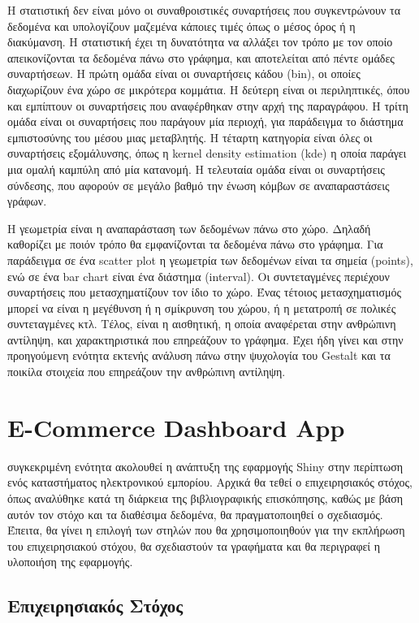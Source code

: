 \documentclass[greek, 12pt]{article}
\begin{document}
Η στατιστική δεν είναι μόνο οι συναθροιστικές συναρτήσεις που συγκεντρώνουν τα δεδομένα και υπολογίζουν μαζεμένα κάποιες τιμές όπως ο μέσος όρος ή η διακύμανση. Η στατιστική έχει τη δυνατότητα να αλλάξει τον τρόπο με τον οποίο απεικονίζονται τα δεδομένα πάνω στο γράφημα, και αποτελείται από πέντε ομάδες συναρτήσεων. Η πρώτη ομάδα είναι οι συναρτήσεις κάδου (bin), οι οποίες διαχωρίζουν ένα χώρο σε μικρότερα κομμάτια. Η δεύτερη είναι οι περιληπτικές, όπου και εμπίπτουν οι συναρτήσεις που αναφέρθηκαν στην αρχή της παραγράφου. Η τρίτη ομάδα είναι οι συναρτήσεις που παράγουν μία περιοχή, για παράδειγμα το διάστημα εμπιστοσύνης του μέσου μιας μεταβλητής. Η τέταρτη κατηγορία είναι όλες οι συναρτήσεις εξομάλυνσης, όπως η kernel density estimation (kde) η οποία παράγει μια ομαλή καμπύλη από μία κατανομή. Η τελευταία ομάδα είναι οι συναρτήσεις σύνδεσης, που αφορούν σε μεγάλο βαθμό την ένωση κόμβων σε αναπαραστάσεις γράφων.

Η γεωμετρία είναι η αναπαράσταση των δεδομένων πάνω στο χώρο. Δηλαδή καθορίζει με ποιόν τρόπο θα εμφανίζονται τα δεδομένα πάνω στο γράφημα. Για παράδειγμα σε ένα scatter plot η γεωμετρία των δεδομένων είναι τα σημεία (points), ενώ σε ένα bar chart είναι ένα διάστημα (interval). Οι συντεταγμένες περιέχουν συναρτήσεις που μετασχηματίζουν τον ίδιο το χώρο. Ένας τέτοιος μετασχηματισμός μπορεί να είναι η μεγέθυνση ή η σμίκρυνση του χώρου, ή η μετατροπή σε πολικές συντεταγμένες κτλ. Τέλος, είναι η αισθητική, η οποία αναφέρεται στην ανθρώπινη αντίληψη, και χαρακτηριστικά που επηρεάζουν το γράφημα. Έχει ήδη γίνει και στην προηγούμενη ενότητα εκτενής ανάλυση πάνω στην ψυχολογία του Gestalt και τα ποικίλα στοιχεία που επηρεάζουν την ανθρώπινη αντίληψη.

\newpage

\section{E-Commerce Dashboard App}

 συγκεκριμένη ενότητα ακολουθεί η ανάπτυξη της εφαρμογής Shiny στην περίπτωση ενός καταστήματος ηλεκτρονικού εμπορίου. Αρχικά θα τεθεί ο επιχειρησιακός στόχος, όπως αναλύθηκε κατά τη διάρκεια της βιβλιογραφικής επισκόπησης, καθώς με βάση αυτόν τον στόχο και τα διαθέσιμα δεδομένα, θα πραγματοποιηθεί ο σχεδιασμός. Έπειτα, θα γίνει η επιλογή των στηλών που θα χρησιμοποιηθούν για την εκπλήρωση του επιχειρησιακού στόχου, θα σχεδιαστούν τα γραφήματα και θα περιγραφεί η υλοποιήση της εφαρμογής.

\subsection{Επιχειρησιακός Στόχος}
\end{document}

